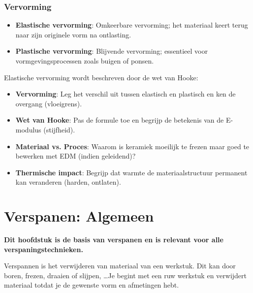 \documentclass[a4paper,12pt,twoside]{report}
\begin{document}
\subsection{Vervorming}

\begin{conceptbox}[title=Vervormingsmodi]
    \begin{itemize}
        \item \textbf{Elastische vervorming}: Omkeerbare vervorming; het materiaal keert terug naar zijn originele vorm na ontlasting.
        \item \textbf{Plastische vervorming}: Blijvende vervorming; essentieel voor vormgevingsprocessen zoals buigen of ponsen.
    \end{itemize}
\end{conceptbox}

Elastische vervorming wordt beschreven door de wet van Hooke:

\begin{warningbox}[title=EXAMEN CHECKLIST: MATERIALEN]
    \begin{itemize}
        \item \textbf{Vervorming}: Leg het verschil uit tussen elastisch en plastisch en ken de overgang (vloeigrens).
        \item \textbf{Wet van Hooke}: Pas de formule toe en begrijp de betekenis van de E-modulus (stijfheid).
        \item \textbf{Materiaal vs. Proces}: Waarom is keramiek moeilijk te frezen maar goed te bewerken met EDM (indien geleidend)?
        \item \textbf{Thermische impact}: Begrijp dat warmte de materiaalstructuur permanent kan veranderen (harden, ontlaten).
    \end{itemize}
\end{warningbox}


\chapter{Verspanen: Algemeen}
\label{chap:Algemeen verspanen}
\textbf{Dit hoofdstuk is de basis van verspanen en is relevant voor alle verspaningstechnieken.}

Verspannen is het verwijderen van materiaal van een werkstuk. Dit kan door boren, frezen, draaien of slijpen, \ldots Je begint met een ruw werkstuk en verwijdert materiaal totdat je de gewenste vorm en afmetingen hebt.
\end{document}
